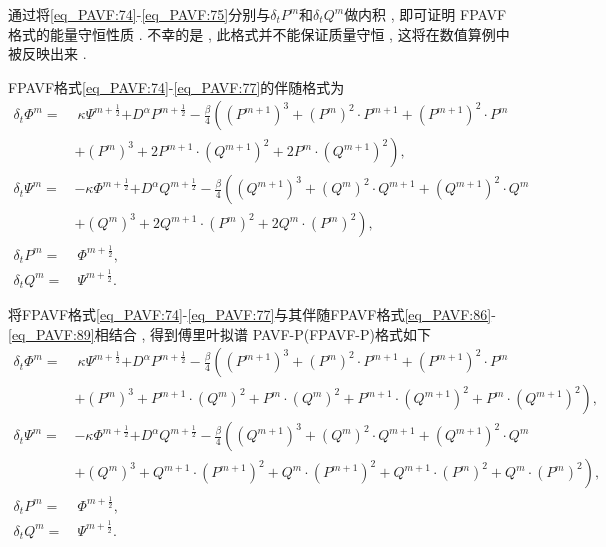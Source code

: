 通过将\eqref{eq_PAVF:74}-\eqref{eq_PAVF:75}分别与$\delta_t P^{m}$和$\delta_t Q^{m}$做内积 , 即可证明 FPAVF 格式的能量守恒性质 . 
不幸的是 , 此格式并不能保证质量守恒 , 这将在数值算例中被反映出来 . 

FPAVF格式\eqref{eq_PAVF:74}-\eqref{eq_PAVF:77}的伴随格式为
\begin{align}
\delta_{t} \varPhi^{m}=&~\kappa \Psi^{m+\frac{1}{2}}{+D^{\alpha} P^{m+\frac{1}{2}}}-\frac{\beta}{4}\left( (P^{m+1})^3+ (P^{m})^{2}\cdot P^{m+1}+(P^{m+1})^{2}\cdot P^{m}\right . \nonumber\\
	&\left. + (P^{m})^{3}+2 P^{m+1}\cdot (Q^{m+1})^{2}+2 P^{m}\cdot (Q^{m+1})^{2}\right) , \label{eq_PAVF:86}\\
\delta_{t} \Psi^{m}=&-\kappa \varPhi^{m+\frac{1}{2}}{+D^{\alpha} Q^{m+\frac{1}{2}}}-\frac{\beta}{4}\left( (Q^{m+1})^3+ (Q^{m})^{2}\cdot Q^{m+1}+ (Q^{m+1})^{2}\cdot Q^{m}\right . \nonumber\\
	&\left . + (Q^{m})^{3}+2 Q^{m+1}\cdot (P^{m})^{2}+2 Q^{m}\cdot (P^{m})^{2}\right) , \label{eq_PAVF:87}\\
\delta_{t} P^{m}=&~\varPhi^{m+\frac{1}{2}} , \label{eq_PAVF:88}\\
\delta_{t} Q^{m}=&~\Psi^{m+\frac{1}{2}} . \label{eq_PAVF:89}
\end{align}

将FPAVF格式\eqref{eq_PAVF:74}-\eqref{eq_PAVF:77}与其伴随FPAVF格式\eqref{eq_PAVF:86}-\eqref{eq_PAVF:89}相结合 , 得到傅里叶拟谱 PAVF-P(FPAVF-P)格式如下
\begin{align}
\delta_{t} \varPhi^{m}=&~\kappa \Psi^{m+\frac{1}{2}}{+D^{\alpha} P^{m+\frac{1}{2}}}-\frac{\beta}{4}\left((P^{m+1})^3+(P^{m})^{2}\cdot P^{m+1}+(P^{m+1})^{2}\cdot P^{m}\right . \nonumber\\
	&\left . +(P^{m})^{3}+P^{m+1}\cdot (Q^{m})^{2}+P^{m}\cdot (Q^{m})^{2}+P^{m+1}\cdot (Q^{m+1})^{2}+P^{m}\cdot (Q^{m+1})^{2}\right) , \label{eq_PAVF:98}\\
\delta_{t} \Psi^{m}=&-\kappa \varPhi^{m+\frac{1}{2}}{+D^{\alpha} Q^{m+\frac{1}{2}}}-\frac{\beta}{4}\left((Q^{m+1})^3+(Q^{m})^{2}\cdot Q^{m+1}+(Q^{m+1})^{2}\cdot Q^{m}\right . \nonumber\\
	&\left . +(Q^{m})^{3}+Q^{m+1}\cdot (P^{m+1})^{2}+Q^{m}\cdot (P^{m+1})^{2}+Q^{m+1}\cdot (P^{m})^{2}+Q^{m}\cdot (P^{m})^{2}\right) , \label{eq_PAVF:99}\\
\delta_{t} P^{m}=&~\varPhi^{m+\frac{1}{2}} , \label{eq_PAVF:100}\\
\delta_{t} Q^{m}=&~\Psi^{m+\frac{1}{2}} . \label{eq_PAVF:101}
\end{align}

